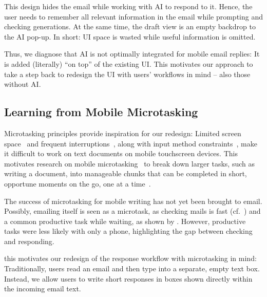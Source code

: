 This design hides the email while working with AI to respond to it. Hence, the user needs to remember all relevant information in the email while prompting and checking generations. At the same time, the draft view is an empty backdrop to the AI pop-up.
In short: UI space is wasted while useful information is omitted. 

Thus, we diagnose that AI is not optimally integrated for mobile email replies:
It is added (literally) ``on top'' of the existing UI. %
This motivates our approach to take a step back to redesign the UI with users' workflows in mind -- also those without AI. 










\subsection{Learning from Mobile Microtasking}
Microtasking principles provide inspiration for our redesign: Limited screen space~\cite{raptis2013phonesize} and frequent interruptions~\cite{leiva2012backtoapp, oulasvirta2005bursts}, along with input method constraints~\cite{palin2019mobiletyping}, make it difficult to work on text documents on mobile touchscreen devices.
This motivates research on mobile microtasking~\cite{cheng2015breakitdown} to break down larger tasks, such as writing a document, into manageable chunks that can be completed in short, opportune moments on the go, one at a time~\cite{august2020microwriting, iqbal2018playwrite}.

The success of microtasking for mobile writing has not yet been brought to email. Possibly, emailing itself is seen as a microtask, as checking mails is fast (cf.~\cite{bao2011phoneuse, oulasvirta2012habits, zheng2024waitingtime}) and a common productive task while waiting, as shown by \citet{zheng2024waitingtime}. However, productive tasks were less likely with only a phone, highlighting the gap between checking and responding. 

 this motivates our redesign of the response workflow with microtasking in mind: Traditionally, users read an email and then type into a separate, empty text box. Instead, we allow users to write short responses in boxes shown directly within the incoming email text.

